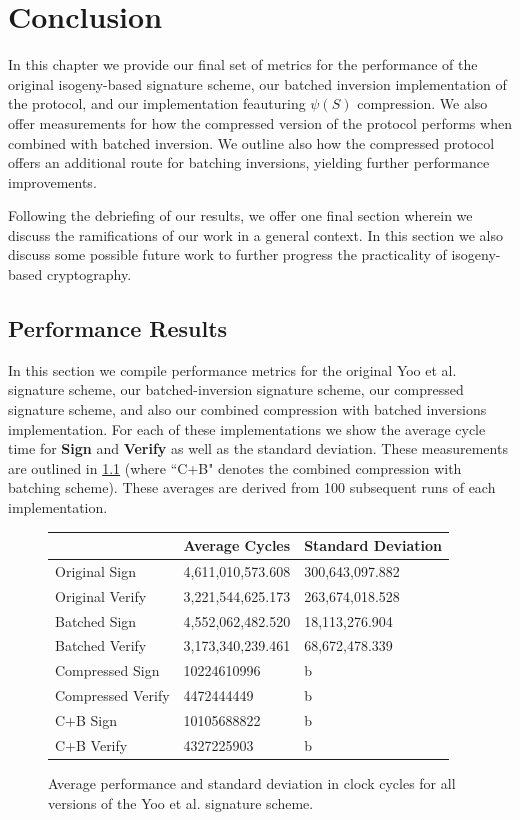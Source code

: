 \chapter{Conclusion}
\label{ch:conclusion}

In this chapter we provide our final set of metrics for the performance of the original isogeny-based signature scheme, our batched inversion implementation of the protocol, and our implementation feauturing $\psi(S)$ compression. We also offer measurements for how the compressed version of the protocol performs when combined with batched inversion. We outline also how the compressed protocol offers an additional route for batching inversions, yielding further performance improvements.

Following the debriefing of our results, we offer one final section wherein we discuss the ramifications of our work in a general context. In this section we also discuss some possible future work to further progress the practicality of isogeny-based cryptography.



\section{Performance Results}

In this section we compile performance metrics for the original Yoo et al. signature scheme, our batched-inversion signature scheme, our compressed signature scheme, and also our combined compression with batched inversions implementation. For each of these implementations we show the average cycle time for \textbf{Sign} and \textbf{Verify} as well as the standard deviation. These measurements are outlined in \ref{fig:allmeasurements} (where ``C+B" denotes the combined compression with batching scheme). These averages are derived from 100 subsequent runs of each implementation.

\begin{figure}
\begin{center}
\begin{tabular}{ | l | b | b | }
\hline
& Average Cycles & Standard Deviation \\
\hline
Original Sign & 4,611,010,573.608 & 300,643,097.882 \\
Original Verify & 3,221,544,625.173 & 263,674,018.528 \\
Batched Sign & 4,552,062,482.520 & 18,113,276.904 \\
Batched Verify & 3,173,340,239.461 & 68,672,478.339 \\
Compressed Sign & 10224610996 & b \\
Compressed Verify & 4472444449 & b \\
C+B Sign & 10105688822 & b \\
C+B Verify & 4327225903 & b \\
\hline
\end{tabular}
\end{center}
\caption{Average performance and standard deviation in clock cycles for all versions of the Yoo et al. signature scheme.}
\label{fig:allmeasurements}
\end{figure}

